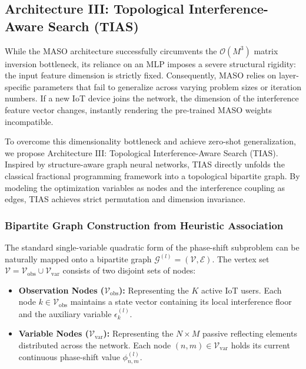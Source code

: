 \documentclass[journal]{IEEEtran}
\begin{document}
\subsection{Architecture III: Topological Interference-Aware Search (TIAS)}
\label{subsec:tias}

While the MASO architecture successfully circumvents the $\mathcal{O}(M^3)$ matrix inversion bottleneck, its reliance on an MLP imposes a severe structural rigidity: the input feature dimension is strictly fixed. Consequently, MASO relies on layer-specific parameters that fail to generalize across varying problem sizes or iteration numbers. If a new IoT device joins the network, the dimension of the interference feature vector changes, instantly rendering the pre-trained MASO weights incompatible. 

To overcome this dimensionality bottleneck and achieve zero-shot generalization, we propose Architecture III: Topological Interference-Aware Search (TIAS). Inspired by structure-aware graph neural networks, TIAS directly unfolds the classical fractional programming framework into a topological bipartite graph. By modeling the optimization variables as nodes and the interference coupling as edges, TIAS achieves strict permutation and dimension invariance.

\subsubsection{Bipartite Graph Construction from Heuristic Association}
\label{subsubsec:tias_graph}

The standard single-variable quadratic form of the phase-shift subproblem can be naturally mapped onto a bipartite graph $\mathcal{G}^{(l)} = (\mathcal{V}, \mathcal{E})$. The vertex set $\mathcal{V} = \mathcal{V}_{\text{obs}} \cup \mathcal{V}_{\text{var}}$ consists of two disjoint sets of nodes:
\begin{itemize}
    \item \textbf{Observation Nodes ($\mathcal{V}_{\text{obs}}$):} Representing the $K$ active IoT users. Each node $k \in \mathcal{V}_{\text{obs}}$ maintains a state vector containing its local interference floor and the auxiliary variable $\epsilon_k^{(l)}$.
    \item \textbf{Variable Nodes ($\mathcal{V}_{\text{var}}$):} Representing the $N \times M$ passive reflecting elements distributed across the network. Each node $(n,m) \in \mathcal{V}_{\text{var}}$ holds its current continuous phase-shift value $\phi_{n,m}^{(l)}$.
\end{itemize}
\end{document}

